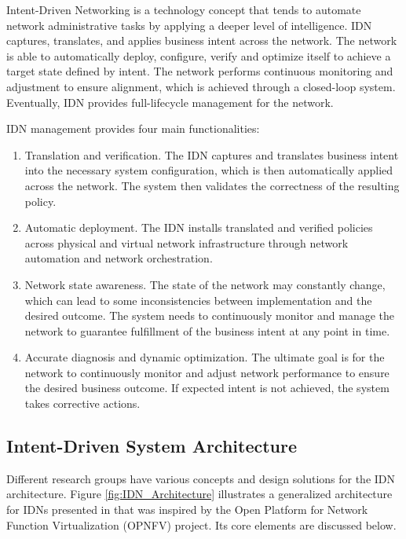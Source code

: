 Intent-Driven Networking is a technology concept that tends to automate network administrative tasks by applying a deeper level of intelligence. IDN captures, translates, and applies business intent across the network. The network is able to automatically deploy, configure, verify and optimize itself to achieve a target state defined by intent. The network performs continuous monitoring and adjustment to ensure alignment, which is achieved through a closed-loop system. Eventually, IDN provides full-lifecycle management for the network. \cite{8968429}

IDN management provides four main functionalities: \cite[271]{Wei2020}

\begin{enumerate}
	\item Translation and verification. The IDN captures and translates business intent into the necessary system configuration, which is then automatically applied across the network. The system then validates the correctness of the resulting policy.
	\item Automatic deployment. The IDN installs translated and verified policies across physical and virtual network infrastructure through network automation and network orchestration.
	\item Network state awareness. The state of the network may constantly change, which can lead to some inconsistencies between implementation and the desired outcome. The system needs to continuously monitor and manage the network to guarantee fulfillment of the business intent at any point in time.
	\item Accurate diagnosis and dynamic optimization. The ultimate goal is for the network to continuously monitor and adjust network performance to ensure the desired business outcome. If expected intent is not achieved, the system takes corrective actions.
\end{enumerate}


\subsection{Intent-Driven System Architecture}

Different research groups have various concepts and design solutions for the IDN architecture. Figure \ref{fig:IDN_Architecture} illustrates a generalized architecture for IDNs presented in \cite[3]{Saha2018} that was inspired by the Open Platform for Network Function Virtualization (OPNFV) project. Its core elements are discussed below.  

